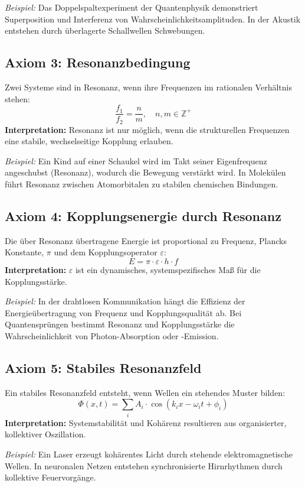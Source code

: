 \documentclass[12pt]{article}
\begin{document}
\textit{Beispiel:} Das Doppelspaltexperiment der Quantenphysik demonstriert Superposition und Interferenz von Wahrscheinlichkeitsamplituden. In der Akustik entstehen durch überlagerte Schallwellen Schwebungen.

\subsection{Axiom 3: Resonanzbedingung}
Zwei Systeme sind in Resonanz, wenn ihre Frequenzen im rationalen Verhältnis stehen:
\[
\frac{f_1}{f_2} = \frac{n}{m},\quad n, m \in \mathbb{Z}^+
\]
\textbf{Interpretation:} Resonanz ist nur möglich, wenn die strukturellen Frequenzen eine stabile, wechselseitige Kopplung erlauben.

\textit{Beispiel:} Ein Kind auf einer Schaukel wird im Takt seiner Eigenfrequenz angeschubst (Resonanz), wodurch die Bewegung verstärkt wird. In Molekülen führt Resonanz zwischen Atomorbitalen zu stabilen chemischen Bindungen.

\subsection{Axiom 4: Kopplungsenergie durch Resonanz}
Die über Resonanz übertragene Energie ist proportional zu Frequenz, Plancks Konstante, $\pi$ und dem Kopplungsoperator $\varepsilon$:
\[
E = \pi \cdot \varepsilon \cdot h \cdot f
\]
\textbf{Interpretation:} $\varepsilon$ ist ein dynamisches, systemspezifisches Maß für die Kopplungsstärke.

\textit{Beispiel:} In der drahtlosen Kommunikation hängt die Effizienz der Energieübertragung von Frequenz und Kopplungsqualität ab. Bei Quantensprüngen bestimmt Resonanz und Kopplungsstärke die Wahrscheinlichkeit von Photon-Absorption oder -Emission.

\subsection{Axiom 5: Stabiles Resonanzfeld}
Ein stabiles Resonanzfeld entsteht, wenn Wellen ein stehendes Muster bilden:
\[
\Phi(x, t) = \sum_{i} A_i \cdot \cos(k_i x - \omega_i t + \phi_i)
\]
\textbf{Interpretation:} Systemstabilität und Kohärenz resultieren aus organisierter, kollektiver Oszillation.

\textit{Beispiel:} Ein Laser erzeugt kohärentes Licht durch stehende elektromagnetische Wellen. In neuronalen Netzen entstehen synchronisierte Hirnrhythmen durch kollektive Feuervorgänge.
\end{document}
